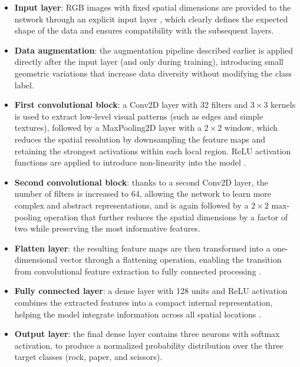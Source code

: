 \documentclass[11pt,a4paper]{article}
\begin{document}
\begin{itemize}
    \item \textbf{Input layer}: RGB images with fixed spatial dimensions are provided to the network through an explicit input layer \cite{keras_input_layer}, which clearly defines the expected shape of the data and ensures compatibility with the subsequent layers.
    
    \item \textbf{Data augmentation}: the augmentation pipeline described earlier is applied directly after the input layer (and only during training), introducing small geometric variations that increase data diversity without modifying the class label.
    
    \item \textbf{First convolutional block}: a Conv2D layer with 32 filters and $3\times3$ kernels is used to extract low-level visual patterns (such as edges and simple textures), followed by a MaxPooling2D layer with a $2\times2$ window, which reduces the spatial resolution by downsampling the feature maps and retaining the strongest activations within each local region. ReLU activation functions are applied to introduce non-linearity into the model \cite{keras_conv2d,keras_maxpooling2d,keras_relu}.
    
    \item \textbf{Second convolutional block}: thanks to a second Conv2D layer, the number of filters is increased to 64, allowing the network to learn more complex and abstract representations, and is again followed by a $2\times2$ max-pooling operation that further reduces the spatial dimensions by a factor of two while preserving the most informative features.
    
    \item \textbf{Flatten layer}: the resulting feature maps are then transformed into a one-dimensional vector through a flattening operation, enabling the transition from convolutional feature extraction to fully connected processing \cite{keras_flatten}.
    
    \item \textbf{Fully connected layer}: a dense layer with 128 units and ReLU activation combines the extracted features into a compact internal representation, helping the model integrate information across all spatial locations \cite{keras_dense}.
    
    \item \textbf{Output layer}: the final dense layer contains three neurons with softmax activation, to produce a normalized probability distribution over the three target classes (rock, paper, and scissors).
\end{itemize}
\end{document}
